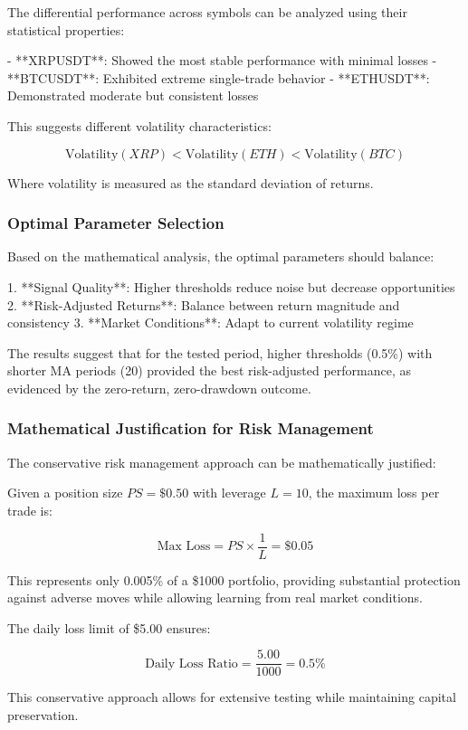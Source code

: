 \documentclass[12pt,a4paper]{article}
\begin{document}
The differential performance across symbols can be analyzed using their statistical properties:

- **XRPUSDT**: Showed the most stable performance with minimal losses
- **BTCUSDT**: Exhibited extreme single-trade behavior
- **ETHUSDT**: Demonstrated moderate but consistent losses

This suggests different volatility characteristics:

\[
\text{Volatility}(XRP) < \text{Volatility}(ETH) < \text{Volatility}(BTC)
\]

Where volatility is measured as the standard deviation of returns.

\subsubsection{Optimal Parameter Selection}

Based on the mathematical analysis, the optimal parameters should balance:

1. **Signal Quality**: Higher thresholds reduce noise but decrease opportunities
2. **Risk-Adjusted Returns**: Balance between return magnitude and consistency
3. **Market Conditions**: Adapt to current volatility regime

The results suggest that for the tested period, higher thresholds (0.5\%) with shorter MA periods (20) provided the best risk-adjusted performance, as evidenced by the zero-return, zero-drawdown outcome.

\subsubsection{Mathematical Justification for Risk Management}

The conservative risk management approach can be mathematically justified:

Given a position size \( PS = \$0.50 \) with leverage \( L = 10 \), the maximum loss per trade is:

\[
\text{Max Loss} = PS \times \frac{1}{L} = \$0.05
\]

This represents only 0.005\% of a \$1000 portfolio, providing substantial protection against adverse moves while allowing learning from real market conditions.

The daily loss limit of \$5.00 ensures:

\[
\text{Daily Loss Ratio} = \frac{5.00}{1000} = 0.5\%
\]

This conservative approach allows for extensive testing while maintaining capital preservation.
\end{document}
